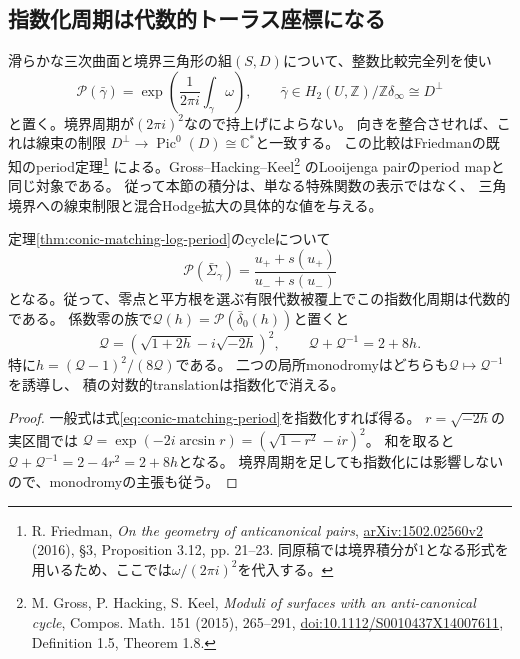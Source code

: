 \subsection{指数化周期は代数的トーラス座標になる}
滑らかな三次曲面と境界三角形の組$(S,D)$について、整数比較完全列を使い
\[
 \mathcal P(\bar\gamma)=
 \exp\left(\frac{1}{2\pi i}\int_\gamma\omega\right),\qquad
 \bar\gamma\in H_2(U,\mathbb Z)/\mathbb Z\delta_\infty
                  \cong D^\perp
\]
と置く。境界周期が$(2\pi i)^2$なので持上げによらない。
向きを整合させれば、これは線束の制限
$D^\perp\to\operatorname{Pic}^0(D)\cong\mathbb C^*$と一致する。
この比較はFriedmanの既知のperiod定理\footnote{
R. Friedman, \emph{On the geometry of anticanonical pairs},
\href{https://arxiv.org/abs/1502.02560v2}{arXiv:1502.02560v2} (2016),
\S3, Proposition 3.12, pp. 21--23.
同原稿では境界積分が1となる形式を用いるため、ここでは$\omega/(2\pi i)^2$を代入する。}
による。Gross--Hacking--Keel\footnote{
M. Gross, P. Hacking, S. Keel, \emph{Moduli of surfaces with an anti-canonical cycle},
Compos. Math. 151 (2015), 265--291,
\href{https://doi.org/10.1112/S0010437X14007611}{doi:10.1112/S0010437X14007611},
Definition 1.5, Theorem 1.8.}
のLooijenga pairのperiod mapと同じ対象である。
従って本節の積分は、単なる特殊関数の表示ではなく、
三角境界への線束制限と混合Hodge拡大の具体的な値を与える。

\begin{corollary}
\label{cor:algebraic-exponential-period}
定理\ref{thm:conic-matching-log-period}のcycleについて
\[
 \mathcal P(\bar\Sigma_\gamma)=\frac{u_++s(u_+)}{u_-+s(u_-)}
\]
となる。従って、零点と平方根を選ぶ有限代数被覆上でこの指数化周期は代数的である。
係数零の族で$\mathcal Q(h)=\mathcal P(\bar\delta_0(h))$と置くと
\begin{equation}\label{eq:algebraic-period-trace}
 \mathcal Q=(\sqrt{1+2h}-i\sqrt{-2h})^2,
 \qquad
 \boxed{\mathcal Q+\mathcal Q^{-1}=2+8h}.
\end{equation}
特に$h=(\mathcal Q-1)^2/(8\mathcal Q)$である。
二つの局所monodromyはどちらも$\mathcal Q\mapsto\mathcal Q^{-1}$を誘導し、
積の対数的translationは指数化で消える。
\end{corollary}
\begin{proof}
一般式は式\eqref{eq:conic-matching-period}を指数化すれば得る。
$r=\sqrt{-2h}$の実区間では
$\mathcal Q=\exp(-2i\arcsin r)=(\sqrt{1-r^2}-ir)^2$。
和を取ると$\mathcal Q+\mathcal Q^{-1}=2-4r^2=2+8h$となる。
境界周期を足しても指数化には影響しないので、monodromyの主張も従う。
\end{proof}

